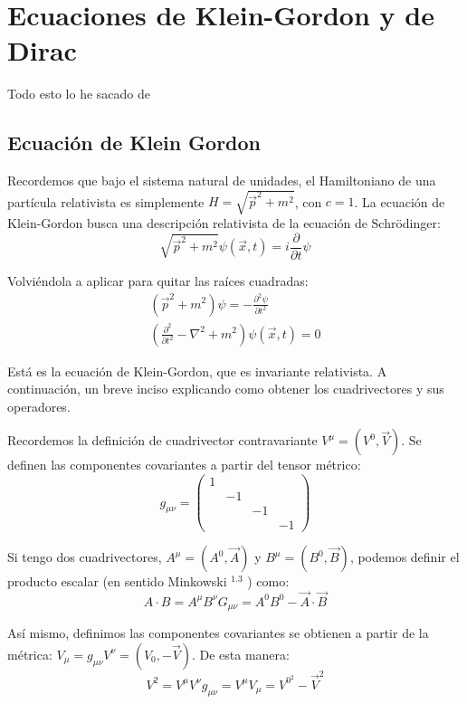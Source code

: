 \setchapterpreamble[u]{\margintoc}
\chapter{Ecuaciones de Klein-Gordon y de Dirac}

\begin{center}
  \large Todo esto lo he sacado de \cite{Dobdado}
\end{center}
\section{Ecuación de Klein Gordon}
Recordemos que bajo el sistema natural de unidades, el Hamiltoniano de una partícula relativista es simplemente $H=\sqrt{\vec{p}^{2}+m^{2}}$, con $c=1$. La ecuación de Klein-Gordon busca una descripción relativista de la ecuación de Schrödinger:
$$
\sqrt{\vec{p}^{2}+m^{2}} \psi(\vec{x}, t)=i \frac{\partial}{\partial t} \psi
$$

Volviéndola a aplicar para quitar las raíces cuadradas:
$$
\begin{gathered}
\left(\vec{p}^{2}+m^{2}\right) \psi=-\frac{\partial^{2} \psi}{\partial t^{2}} \\
\left(\frac{\partial^{2}}{\partial t^{2}}-\nabla^{2}+m^{2}\right) \psi(\vec{x}, t)=0
\end{gathered}
$$

Está es la ecuación de Klein-Gordon, que es invariante relativista. A continuación, un breve inciso explicando como obtener los cuadrivectores y sus operadores.

Recordemos la definición de cuadrivector contravariante $V^{\mu}=\left(V^{0}, \vec{V}\right)$. Se definen las componentes covariantes a partir del tensor métrico:
$$
g_{\mu \nu}=\left(\begin{array}{llll}
1 & & & \\
& -1 & & \\
& & -1 & \\
& & & -1
\end{array}\right)
$$

Si tengo dos cuadrivectores, $A^{\mu}=\left(A^{0}, \vec{A}\right)$ y $B^{\mu}=\left(B^{0}, \vec{B}\right)$, podemos definir el producto escalar (en sentido Minkowski ${ }^{1.3}$ ) como:
$$
A \cdot B=A^{\mu} B^{\nu} G_{\mu \nu}=A^{0} B^{0}-\vec{A} \cdot \vec{B}
$$

Así mismo, definimos las componentes covariantes se obtienen a partir de la métrica: $V_{\mu}=g_{\mu \nu} V^{\nu}=\left(V_{0},-\vec{V}\right)$. De esta manera:
$$
V^{2}=V^{\mu} V^{\nu} g_{\mu \nu}=V^{\mu} V_{\mu}=V^{0^{2}}-\vec{V}^{2}
$$

